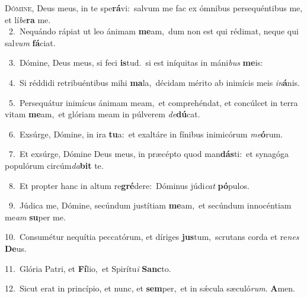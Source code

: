\lettrine{\initial\textcolor{\initialcolor}{D}}{ómine,} Deus meus, in te spe\-\textbf{rá}\-vi:~\star salvum me fac ex ómnibus persequéntibus me, et lí\-\textit{be}\-\textbf{ra} me.\\
{\numbfont\textcolor{\numbcolor}{~2.}}~Nequándo rápiat ut leo ánimam \textbf{me}\-am,~\star dum non est qui rédimat, neque qui sal\textit{vum} \textbf{fá}\-ciat.\par
{\numbfont\textcolor{\numbcolor}{~3.}}~Dómine, Deus meus, si feci \textbf{is}\-tud.~\star si est iníquitas in máni\textit{bus} \textbf{me}\-is:\par
{\numbfont\textcolor{\numbcolor}{~4.}}~Si réddidi retribuéntibus mihi \textbf{ma}\-la,~\star décidam mérito ab inimícis meis \textit{in}\-\textbf{á}nis.\par
{\numbfont\textcolor{\numbcolor}{~5.}}~Persequátur inimícus ánimam meam,~\dagger et comprehéndat, et concúlcet in terra vitam \textbf{me}\-am,~\star et glóriam meam in púlverem \textit{de}\-\textbf{dú}cat.\par
{\numbfont\textcolor{\numbcolor}{~6.}}~Exsúrge, Dómine, in ira \textbf{tu}\-a:~\star et exaltáre in fínibus inimicórum \textit{me}\-\textbf{ó}rum.\par
{\numbfont\textcolor{\numbcolor}{~7.}}~Et exsúrge, Dómine Deus meus, in præcépto quod man\-\textbf{dás}\-ti:~\star et synagóga populórum circúm\-\textit{da}\-\textbf{bit} te.\par
{\numbfont\textcolor{\numbcolor}{~8.}}~Et propter hanc in altum re\-\textbf{gré}\-dere:~\star Dóminus júdi\textit{cat} \textbf{pó}\-pulos.\par
{\numbfont\textcolor{\numbcolor}{~9.}}~Júdica me, Dómine, secúndum justítiam \textbf{me}\-am,~\star et secúndum innocéntiam me\textit{am} \textbf{su}\-per me.\par
{\numbfont\textcolor{\numbcolor}{10.}}~Consumétur nequítia peccatórum, et díriges \textbf{jus}\-tum,~\star scrutans corda et re\textit{nes} \textbf{De}\-us.\par
{\numbfont\textcolor{\numbcolor}{11.}}~Glória Patri, et \textbf{Fí}\-lio,~\star et Spirítu\textit{i} \textbf{Sanc}\-to.\par
{\numbfont\textcolor{\numbcolor}{12.}}~Sicut erat in princípio, et nunc, et \textbf{sem}\-per,~\star et in sǽcula sæculó\-\textit{rum}\-. \textbf{A}\-men.\par

